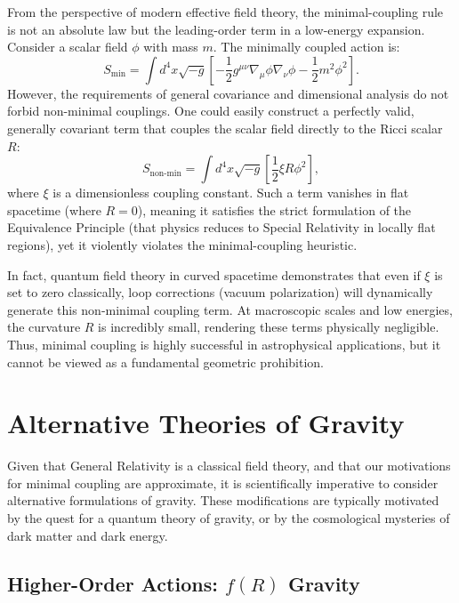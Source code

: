 \documentclass[11pt, a4paper]{report}
\begin{document}
From the perspective of modern effective field theory, the minimal-coupling rule is not an absolute law but the leading-order term in a low-energy expansion. Consider a scalar field $\phi$ with mass $m$. The minimally coupled action is:
\begin{equation}
\label{eq:minimal_scalar}
S_{\text{min}} = \int d^{4}x \sqrt{-g} \left[ -\frac{1}{2} g^{\mu\nu} \nabla_{\mu}\phi \nabla_{\nu}\phi - \frac{1}{2}m^{2}\phi^{2} \right].
\end{equation}
However, the requirements of general covariance and dimensional analysis do not forbid non-minimal couplings. One could easily construct a perfectly valid, generally covariant term that couples the scalar field directly to the Ricci scalar $R$:
\begin{equation}
\label{eq:nonminimal_scalar}
S_{\text{non-min}} = \int d^{4}x \sqrt{-g} \left[ \frac{1}{2} \xi R \phi^{2} \right],
\end{equation}
where $\xi$ is a dimensionless coupling constant. Such a term vanishes in flat spacetime (where $R=0$), meaning it satisfies the strict formulation of the Equivalence Principle (that physics reduces to Special Relativity in locally flat regions), yet it violently violates the minimal-coupling heuristic. 

In fact, quantum field theory in curved spacetime demonstrates that even if $\xi$ is set to zero classically, loop corrections (vacuum polarization) will dynamically generate this non-minimal coupling term. At macroscopic scales and low energies, the curvature $R$ is incredibly small, rendering these terms physically negligible. Thus, minimal coupling is highly successful in astrophysical applications, but it cannot be viewed as a fundamental geometric prohibition.

\section{Alternative Theories of Gravity}

Given that General Relativity is a classical field theory, and that our motivations for minimal coupling are approximate, it is scientifically imperative to consider alternative formulations of gravity. These modifications are typically motivated by the quest for a quantum theory of gravity, or by the cosmological mysteries of dark matter and dark energy.

\subsection{Higher-Order Actions: $f(R)$ Gravity}
\end{document}
